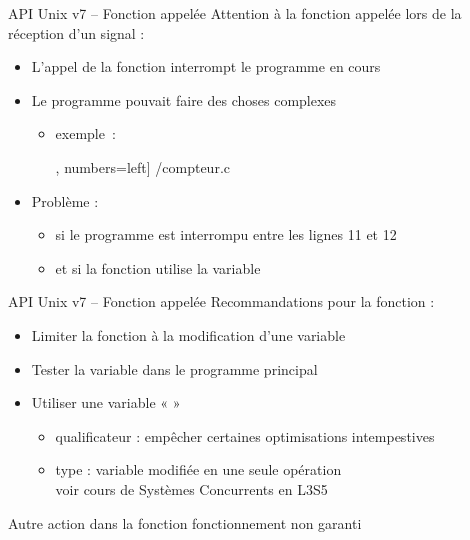 \begin {frame} {API Unix v7 -- Fonction appelée}
    Attention à la fonction appelée lors de la réception d'un signal :

    \begin {itemize}
	\item L'appel de la fonction interrompt le programme en
	    cours
	\item Le programme pouvait faire des choses complexes

	    \begin {itemize}
		\item exemple~:

		    \fE\lstmonstyle, numbers=left] {\inc/compteur.c}
	    \end {itemize}

	\item Problème :
	    \begin {itemize}
		\item si le programme est interrompu entre les lignes 11 et 12
		\item et si la fonction utilise la variable 
	    \end {itemize}
    \end {itemize}
\end {frame}

\begin {frame} {API Unix v7 -- Fonction appelée}
    Recommandations pour la fonction :

    \begin {itemize}
	\item Limiter la fonction à la modification d'une variable
	\item Tester la variable dans le programme principal
	\item Utiliser une variable «  »
	    \begin {itemize}
		\item qualificateur  : empêcher
		    certaines optimisations intempestives
		\item type  : variable modifiée
		    en une seule opération
		    \\
		    \implique voir cours de Systèmes Concurrents en L3S5
	    \end {itemize}
    \end {itemize}

    \vspace* {3mm}

    Autre action dans la fonction \implique fonctionnement
    non garanti
\end {frame}

